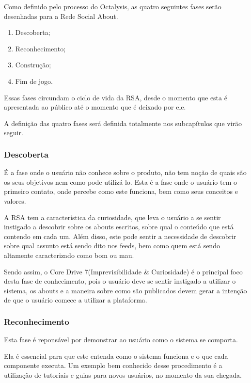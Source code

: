 Como definido pelo processo do Octalysis, as quatro seguintes fases serão
desenhadas para a Rede Social About.

\begin{enumerate}
    \item Descoberta;
    \item Reconhecimento;
    \item Construção;
    \item Fim de jogo.
\end{enumerate}

Essas fases circundam o ciclo de vida da RSA, desde o momento que esta
é apresentada ao público até o momento que é deixado por ele. 

A definição das quatro fases será definida totalmente nos subcapítulos que virão seguir.

\subsubsection{Descoberta}
\label{sub:descoperta}
É a fase onde o usuário não conhece sobre o produto, não tem noção de quais são os
seus objetivos nem como pode utilizá-lo. Esta é a fase onde o usuário tem o primeiro
contato, onde percebe como este funciona, bem como seus conceitos e valores.

A RSA tem a característica da curiosidade, que leva o usuário a se sentir instigado
a descobrir sobre os abouts escritos, sobre qual o conteúdo que está contendo em cada
um. Além disso, este pode sentir a necessidade de descobrir sobre qual assunto está
sendo dito nos feeds, bem como quem está sendo altamente caracterizado como bom ou mau.

Sendo assim, o Core Drive 7(Imprevisibilidade \& Curiosidade) é o principal foco desta fase
de conhecimento, pois o usuário deve se sentir instigado a utilizar o sistema, os abouts
e a maneira sobre como são publicados  devem gerar a intenção de que o usuário comece a utilizar
a plataforma.


\subsubsection{Reconhecimento}
\label{sub:reconhecimento}
Esta fase é reponsável por demonstrar ao usuário como o sistema se comporta.

Ela é essencial para que este entenda como o sistema funciona e o que cada
componente executa. Um exemplo bem conhecido desse procedimento é a utilização
de tutoriais e guias para novos usuários, no momento da sua chegada.

